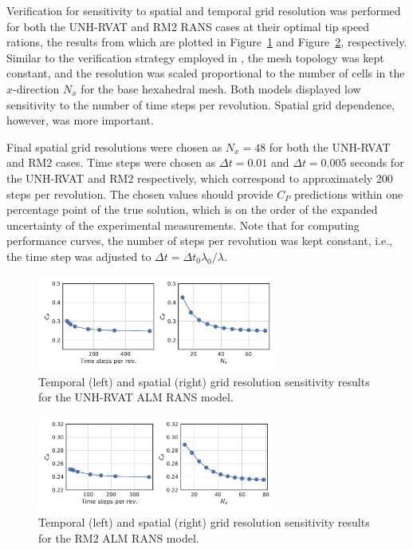 \documentclass[times]{weauth}
\begin{document}
Verification for sensitivity to spatial and temporal grid resolution was
performed for both the UNH-RVAT and RM2 RANS cases at their optimal tip speed
rations, the results from which are plotted in
Figure~\ref{fig:RVAT-ALM-verification} and
Figure~\ref{fig:RM2-ALM-verification}, respectively. Similar to the verification
strategy employed in \cite{Bachant2016-BR-CFD}, the mesh topology was kept
constant, and the resolution was scaled proportional to the number of cells in
the $x$-direction $N_x$ for the base hexahedral mesh. Both models displayed low
sensitivity to the number of time steps per revolution. Spatial grid dependence,
however, was more important.

Final spatial grid resolutions were chosen as $N_x=48$ for both the UNH-RVAT and
RM2 cases. Time steps were chosen as $\Delta t = 0.01$ and $\Delta t = 0.005$
seconds for the UNH-RVAT and RM2 respectively, which correspond to approximately
200 steps per revolution. The chosen values should provide $C_P$ predictions
within one percentage point of the true solution, which is on the order of the
expanded uncertainty of the experimental measurements. Note that for computing
performance curves, the number of steps per revolution was kept constant, i.e.,
the time step was adjusted to $\Delta t = \Delta t_0 \lambda_0 / \lambda$.

\begin{figure}
    \centering

    \includegraphics[width=0.7\textwidth]{RVAT-ALM_verification}

    \caption{Temporal (left) and spatial (right) grid resolution sensitivity
        results for the UNH-RVAT ALM RANS model.}

    \label{fig:RVAT-ALM-verification}
\end{figure}

\begin{figure}
    \centering

    \includegraphics[width=0.7\textwidth]{RM2-ALM_verification}

    \caption{Temporal (left) and spatial (right) grid resolution sensitivity
        results for the RM2 ALM RANS model.}

    \label{fig:RM2-ALM-verification}
\end{figure}
\end{document}
